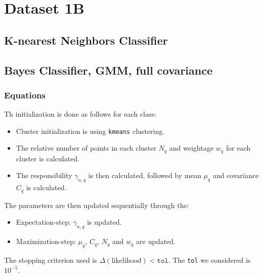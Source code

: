 \documentclass[11pt,a4paper]{article}
\newcommand{\noi}{\noindent}
\def\tt#1{\texttt{#1}}
\begin{document}
\break
\section{Dataset 1B}
\subsection{K-nearest Neighbors Classifier}

\subsection{Bayes Classifier, GMM, full covariance}
\subsubsection{Equations}
Th initialization is done as follows for each class:
\begin{itemize}
    \itemsep0em
    \item Cluster initialization is using \tt{kmeans} clustering.
    \item The relative number of points in each cluster $N_q$ and weightage $w_q$ for each cluster is calculated.
    \item The responsibility $\gamma_{n,q}$ is then calculated, followed by mean $\mu_q$ and covariance $C_q$ is calculated.
\end{itemize}

\noi
The parameters are then updated sequentially through the:
\begin{itemize}
    \itemsep0em
    \item Expectation-step: $\gamma_{n,q}$ is updated.
    \item Maximization-step: $\mu_q$, $C_q$, $N_q$ and $w_q$ are updated.
\end{itemize}

\noi
The stopping criterion used is $\Delta(\text{likelihood})<\tt{tol}$. The \tt{tol} we considered is $10^{-5}$.\\
\end{document}
